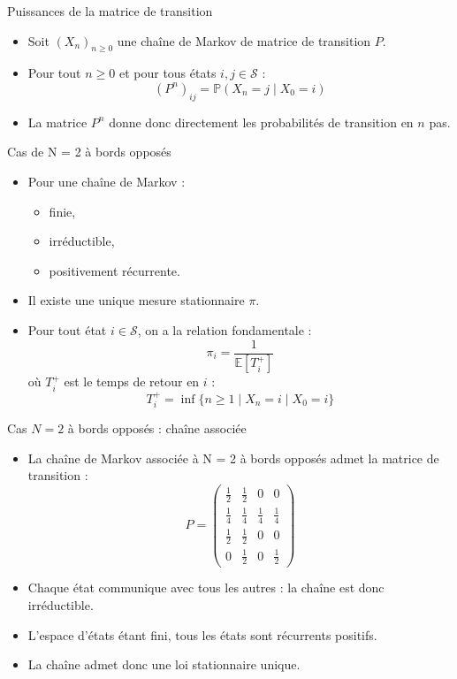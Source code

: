 \documentclass{beamer}
\begin{document}
\begin{frame}{Puissances de la matrice de transition}
\begin{itemize}
  \item Soit $(X_n)_{n \geq 0}$ une chaîne de Markov de matrice de transition $P$.
  \item Pour tout $n \geq 0$ et pour tous états $i,j \in \mathcal{S}$ :
  \[
  (P^n)_{ij} = \mathbb{P}(X_n = j \mid X_0 = i)
  \]
  \item La matrice $P^n$ donne donc directement les probabilités de transition en $n$ pas.
\end{itemize}
\end{frame}

\begin{frame}{Cas de N = 2 à bords opposés}
\begin{itemize}
  \item Pour une chaîne de Markov :
  \begin{itemize}
    \item finie,
    \item irréductible,
    \item positivement récurrente.
  \end{itemize}
  \item Il existe une unique mesure stationnaire $\pi$.
  \item Pour tout état $i \in \mathcal{S}$, on a la relation fondamentale :
  \[
  \pi_i = \frac{1}{\mathbb{E}[T_i^+]}
  \]
  où $T_i^+$ est le temps de retour en $i$ :
  \[
  T_i^+ = \inf\{ n \geq 1 \mid X_n = i \mid X_0 = i \}
  \]
\end{itemize}
\end{frame}

\begin{frame}{Cas $N=2$ à bords opposés : chaîne associée}
\begin{itemize}
  \item La chaîne de Markov associée à N = 2 à bords opposés admet la matrice de transition :
  \[
  P =
  \begin{pmatrix}
  \tfrac12 & \tfrac12 & 0 & 0 \\
  \tfrac14 & \tfrac14 & \tfrac14 & \tfrac14 \\
  \tfrac12 & \tfrac12 & 0 & 0 \\
  0 & \tfrac12 & 0 & \tfrac12
  \end{pmatrix}
  \]
  \item Chaque état communique avec tous les autres : la chaîne est donc irréductible.
  \item L’espace d’états étant fini, tous les états sont récurrents positifs.
  \item La chaîne admet donc une loi stationnaire unique.
\end{itemize}
\end{frame}
\end{document}
